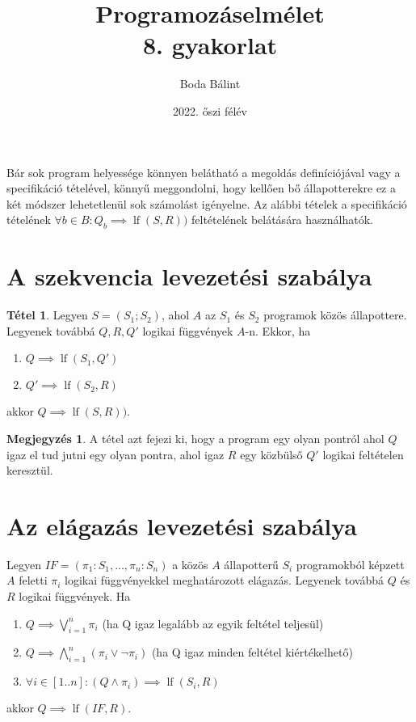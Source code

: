 \documentclass[a4paper,12pt]{article}
\title{\huge{Programozáselmélet} \\ \large 8. gyakorlat}
\author{Boda Bálint}
\date{2022. őszi félév}
\theoremstyle{definition}
\newtheorem*{remark}{Megjegyzés}
\newtheorem*{theorem*}{Tétel}
\DeclareMathOperator{\lf}{lf}
\begin{document}
    \maketitle
    \noindent
    Bár sok program helyessége könnyen belátható a megoldás definíciójával vagy a specifikáció tételével, könnyű meggondolni, hogy kellően bő állapotterekre ez a két módszer lehetetlenül sok számolást igényelne. Az alábbi tételek a specifikáció tételének $\forall b \in B: Q_b \implies \lf(S,R)) $ feltételének belátására használhatók.
    \section{A szekvencia levezetési szabálya}
    \begin{theorem*}
        Legyen $S=(S_1;S_2)$, ahol $A$ az $S_1$ és $S_2$ programok közös állapottere. Legyenek továbbá $Q, R, Q' $ logikai függvények $A$-n. Ekkor, ha
        \begin{enumerate}
        	\item $ Q \implies \lf(S_1,Q') $
        	\item $ Q' \implies \lf(S_2,R) $
        \end{enumerate}
    	akkor $ Q \implies \lf(S,R)) $.
    \end{theorem*}
	\begin{remark}
		A tétel azt fejezi ki, hogy a program egy olyan pontról ahol $Q$ igaz el tud jutni egy olyan pontra, ahol igaz $R$ egy közbülső $Q'$ logikai feltételen keresztül. 
	\end{remark}

	\section{Az elágazás levezetési szabálya}
	Legyen $IF = (\pi_1:S_1,\dots,\pi_n:S_n)$ a közös $A$ állapotterű $S_i$ programokból képzett $A$ feletti $\pi_i$ logikai függvényekkel meghatározott elágazás. Legyenek továbbá $Q$ és $R$ logikai függvények. Ha
	\begin{enumerate}
		\item $ Q \implies \displaystyle \bigvee \limits _{i=1}^{n}{\pi_i}  $ \qquad (ha Q igaz legalább az egyik feltétel teljesül)
		\item $ Q \implies \displaystyle \bigwedge \limits _{i=1}^{n}{(\pi_i \lor \lnot \pi_i)} $ \qquad (ha Q igaz minden feltétel kiértékelhető)
		\item $ \forall i \in \left[ 1..n \right]: (Q \land \pi_i) \implies \lf(S_i,R) $
	\end{enumerate}
	akkor $ Q \implies \lf(IF,R) $.
	\newpage
\end{document}
